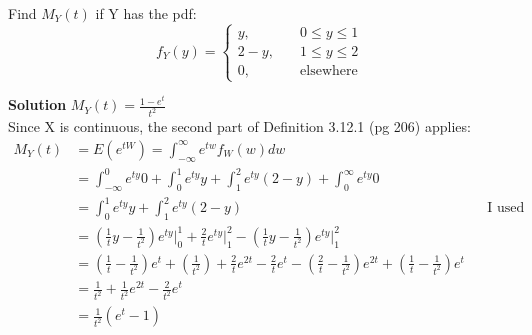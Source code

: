 \documentclass[12pt]{article}
\newenvironment{problem}[2][Problem]{\begin{trivlist}
\item[\hskip \labelsep {\bfseries #1}\hskip \labelsep {\bfseries #2.}]}{\end{trivlist}}
\begin{document}
\begin{problem}{3.12.6} Find $M_Y(t)$ if Y has the pdf: 
$$
f_Y(y) = \left\{
        \begin{array}{ll}
            y, & \quad 0 \leq y \leq 1 \\
            2-y, & \quad 1 \leq y \leq 2 \\
		0,  & \quad \text{elsewhere}
        \end{array}
    \right.
$$

\textbf{Solution} $M_Y(t) = \frac{1-e^t}{t^2}$ \\ Since X is continuous, the second part of Definition 3.12.1 (pg 206) applies: 
\begin{align*}
M_Y(t) &= E(e^{tW})= \int_{-\infty}^{\infty} e^{tw}f_W(w)dw  \\
&= \int_{-\infty}^{0} e^{ty}0 + \int_{0}^{1} e^{ty}y + \int_{1}^{2} e^{ty}(2-y) + \int_{0}^{\infty} e^{ty}0 \\
&= \int_{0}^{1} e^{ty}y + \int_{1}^{2} e^{ty}(2-y)  && \text{I used WolframAlpha here.} \\
&= ( \frac{1}{t}y -\frac{1}{t^2} )e^{ty} \Big|_0^1 + \frac{2}{t} e^{ty} \Big|_1^2 - ( \frac{1}{t} y-\frac{1}{t^2} )e^{ty} \Big|_1^2 \\
&= ( \frac{1}{t} -\frac{1}{t^2} )e^{t} + (\frac{1}{t^2}) + \frac{2}{t} e^{2t} - \frac{2}{t} e^{t} - ( \frac{2}{t} -\frac{1}{t^2} )e^{2t} +( \frac{1}{t} -\frac{1}{t^2} )e^{t} \\
&= \frac{1}{t^2} + \frac{1}{t^2}e^{2t} - \frac{2}{t^2}e^t \\
&= \frac{1}{t^2}(e^t-1)
\end{align*}
\end{problem}
\end{document}
